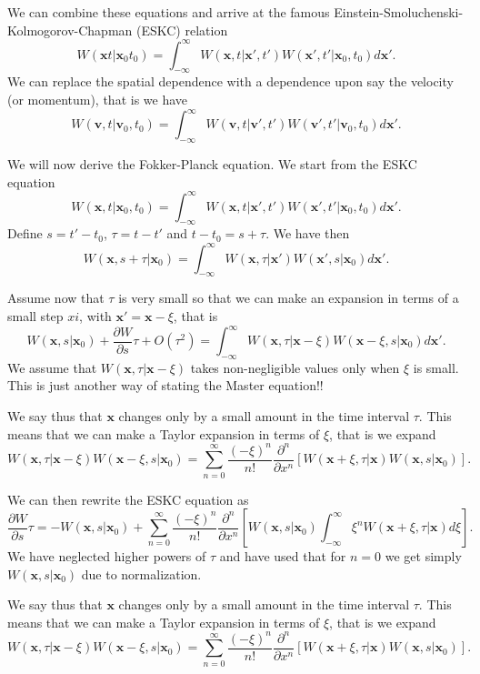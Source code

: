 We can combine these equations and arrive at the famous Einstein-Smoluchenski-Kolmogorov-Chapman (ESKC) relation
\[
 W(\mathbf{x}t|\mathbf{x}_0t_0)  = \int_{-\infty}^{\infty} W(\mathbf{x},t|\mathbf{x}',t')W(\mathbf{x}',t'|\mathbf{x}_0,t_0)d\mathbf{x}'.
\]
We can replace the spatial dependence with a dependence upon say the velocity
(or momentum), that is we have
\[
 W(\mathbf{v},t|\mathbf{v}_0,t_0)  = \int_{-\infty}^{\infty} W(\mathbf{v},t|\mathbf{v}',t')W(\mathbf{v}',t'|\mathbf{v}_0,t_0)d\mathbf{x}'.
\]

We will now derive the Fokker-Planck equation. 
We start from the ESKC equation
\[
 W(\mathbf{x},t|\mathbf{x}_0,t_0)  = \int_{-\infty}^{\infty} W(\mathbf{x},t|\mathbf{x}',t')W(\mathbf{x}',t'|\mathbf{x}_0,t_0)d\mathbf{x}'.
\]
Define $s=t'-t_0$, $\tau=t-t'$ and $t-t_0=s+\tau$. We have then
\[
 W(\mathbf{x},s+\tau|\mathbf{x}_0)  = \int_{-\infty}^{\infty} W(\mathbf{x},\tau|\mathbf{x}')W(\mathbf{x}',s|\mathbf{x}_0)d\mathbf{x}'.
\]

Assume now that $\tau$ is very small so that we can make an expansion in terms of a small step $xi$, with $\mathbf{x}'=\mathbf{x}-\xi$, that is
\[
 W(\mathbf{x},s|\mathbf{x}_0)+\frac{\partial W}{\partial s}\tau +O(\tau^2) = \int_{-\infty}^{\infty} W(\mathbf{x},\tau|\mathbf{x}-\xi)W(\mathbf{x}-\xi,s|\mathbf{x}_0)d\mathbf{x}'.
\]
We assume that $W(\mathbf{x},\tau|\mathbf{x}-\xi)$ takes non-negligible values only when $\xi$ is small. This is just another way of stating the Master equation!!

We say thus that $\mathbf{x}$ changes only by a small amount in the time interval $\tau$. 
This means that we can make a Taylor expansion in terms of $\xi$, that is we
expand
\[
W(\mathbf{x},\tau|\mathbf{x}-\xi)W(\mathbf{x}-\xi,s|\mathbf{x}_0) =
\sum_{n=0}^{\infty}\frac{(-\xi)^n}{n!}\frac{\partial^n}{\partial x^n}\left[W(\mathbf{x}+\xi,\tau|\mathbf{x})W(\mathbf{x},s|\mathbf{x}_0)
\right].
\]

We can then rewrite the ESKC equation as 
\[
\frac{\partial W}{\partial s}\tau=-W(\mathbf{x},s|\mathbf{x}_0)+
\sum_{n=0}^{\infty}\frac{(-\xi)^n}{n!}\frac{\partial^n}{\partial x^n}
\left[W(\mathbf{x},s|\mathbf{x}_0)\int_{-\infty}^{\infty} \xi^nW(\mathbf{x}+\xi,\tau|\mathbf{x})d\xi\right].
\]
We have neglected higher powers of $\tau$ and have used that for $n=0$ 
we get simply $W(\mathbf{x},s|\mathbf{x}_0)$ due to normalization.

We say thus that $\mathbf{x}$ changes only by a small amount in the time interval $\tau$. 
This means that we can make a Taylor expansion in terms of $\xi$, that is we
expand
\[
W(\mathbf{x},\tau|\mathbf{x}-\xi)W(\mathbf{x}-\xi,s|\mathbf{x}_0) =
\sum_{n=0}^{\infty}\frac{(-\xi)^n}{n!}\frac{\partial^n}{\partial x^n}\left[W(\mathbf{x}+\xi,\tau|\mathbf{x})W(\mathbf{x},s|\mathbf{x}_0)
\right].
\]

